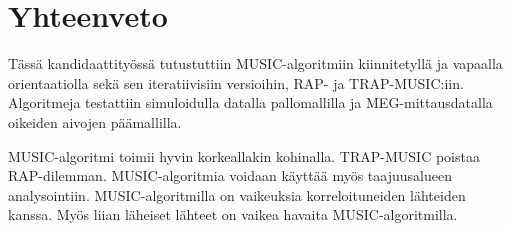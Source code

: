 \section{Yhteenveto}

Tässä kandidaattityössä tutustuttiin MUSIC-algoritmiin kiinnitetyllä ja vapaalla orientaatiolla sekä sen iteratiivisiin versioihin, RAP- ja TRAP-MUSIC:iin. Algoritmeja testattiin simuloidulla datalla pallomallilla ja MEG-mittausdatalla oikeiden aivojen päämallilla. 

MUSIC-algoritmi toimii hyvin korkeallakin kohinalla. TRAP-MUSIC poistaa RAP-dilemman. MUSIC-algoritmia voidaan käyttää myös taajuusalueen analysointiin. MUSIC-algoritmilla on vaikeuksia korreloituneiden lähteiden kanssa. Myös liian läheiset lähteet on vaikea havaita MUSIC-algoritmilla. 